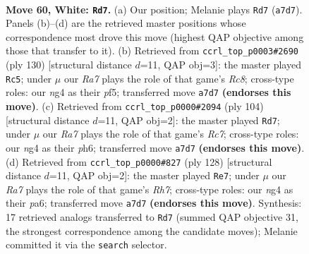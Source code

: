 \documentclass[11pt]{article}
\begin{document}
\clearpage

\begin{figure}[p]\centering
\begin{subfigure}{0.46\textwidth}\centering
\resizebox{\linewidth}{!}{%
\newchessgame
\chessboard[
  setfen={8/R7/6k1/1P6/P5n1/1K6/7r/8 w - - 6 60},
  showmover=false,
  pgfstyle=straightmove, color=movearrow, markmove={a7-d7}
]}
\caption{}
\end{subfigure}\hfill
\begin{subfigure}{0.46\textwidth}\centering
\resizebox{\linewidth}{!}{%
\newchessgame
\chessboard[
  setfen={2R5/5k2/8/5p2/5P2/6P1/6K1/r7 w - - 9 66},
  showmover=false,
  pgfstyle=straightmove, color=movearrow, markmove={c8-c5}
]}
\caption{}
\end{subfigure}
\\[4pt]
\begin{subfigure}{0.46\textwidth}\centering
\resizebox{\linewidth}{!}{%
\newchessgame
\chessboard[
  setfen={6k1/2R5/7p/5P2/6P1/5K2/1r6/8 w - - 9 53},
  showmover=false,
  pgfstyle=straightmove, color=movearrow, markmove={c7-d7}
]}
\caption{}
\end{subfigure}\hfill
\begin{subfigure}{0.46\textwidth}\centering
\resizebox{\linewidth}{!}{%
\newchessgame
\chessboard[
  setfen={k7/7R/p7/8/1P6/1KP5/6r1/8 w - - 3 65},
  showmover=false,
  pgfstyle=straightmove, color=movearrow, markmove={h7-e7}
]}
\caption{}
\end{subfigure}
\caption{\textbf{Move 60, White: \texttt{Rd7}.} (a) Our position; Melanie plays \texttt{Rd7} (\texttt{a7d7}). Panels (b)--(d) are the retrieved master positions whose correspondence most drove this move (highest QAP objective among those that transfer to it). (b) Retrieved from \texttt{ccrl\_top\_p0003\#2690} (ply 130) [structural distance $d$=11, QAP obj=3]: the master played \texttt{Rc5}; under $\mu$ our \emph{Ra7} plays the role of that game's \emph{Rc8}; cross-type roles: our \emph{n}g4 as their \emph{p}f5; transferred move \texttt{a7d7} \textbf{(endorses this move)}. (c) Retrieved from \texttt{ccrl\_top\_p0000\#2094} (ply 104) [structural distance $d$=11, QAP obj=2]: the master played \texttt{Rd7}; under $\mu$ our \emph{Ra7} plays the role of that game's \emph{Rc7}; cross-type roles: our \emph{n}g4 as their \emph{p}h6; transferred move \texttt{a7d7} \textbf{(endorses this move)}. (d) Retrieved from \texttt{ccrl\_top\_p0000\#827} (ply 128) [structural distance $d$=11, QAP obj=2]: the master played \texttt{Re7}; under $\mu$ our \emph{Ra7} plays the role of that game's \emph{Rh7}; cross-type roles: our \emph{n}g4 as their \emph{p}a6; transferred move \texttt{a7d7} \textbf{(endorses this move)}. Synthesis: 17 retrieved analogs transferred to \texttt{Rd7} (summed QAP objective 31, the strongest correspondence among the candidate moves); Melanie committed it via the \texttt{search} selector.}
\label{fig:thought-m118}
\end{figure}
\end{document}

